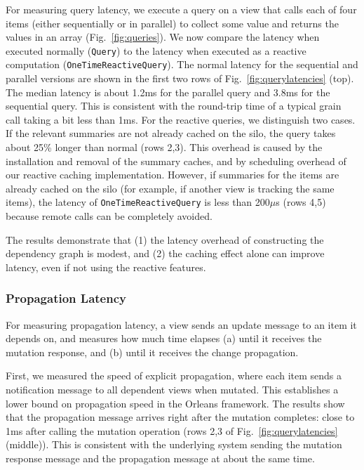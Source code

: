 For measuring query latency, we execute a query on a view that calls each of four items (either sequentially or in parallel) to collect some value and returns the values in an array (Fig.~\ref{fig:queries}). We now compare the latency when executed normally (\lstinline|Query|) to the latency when executed as a reactive computation (\lstinline|OneTimeReactiveQuery|). The normal latency for the sequential and parallel versions are shown in the first two rows of Fig.~\ref{fig:querylatencies} (top). The median latency is about 1.2ms for the parallel query and 3.8ms for the sequential query. This is consistent with the round-trip time of a typical grain call taking a bit less than 1ms. For the reactive queries, we distinguish two cases. If  the relevant summaries are not already cached on the silo, the query takes about 25\% longer than normal (rows 2,3). This overhead is caused by the installation and removal of the summary caches, and by scheduling overhead of our reactive caching implementation. However, if summaries for the items are already cached on the silo (for example, if another view is tracking the same items), the latency of \lstinline|OneTimeReactiveQuery| is less than 200$\mu$s (rows 4,5) because remote calls can be completely avoided. 

The results demonstrate that (1) the latency overhead of constructing the dependency graph is modest, and (2)  the caching effect alone can improve latency, even if not using the reactive features.

\subsubsection{Propagation Latency}

For measuring propagation latency, a view sends an update message to an item it depends on, and measures how much time elapses (a) until it receives the mutation response, and (b) until it receives the change propagation. 

First, we measured the speed of explicit propagation, where each item sends a notification message to all dependent views when mutated. This establishes a lower bound on propagation speed in the Orleans framework. The results show that the propagation message arrives right after the mutation completes: close to 1ms after calling the mutation operation (rows 2,3 of Fig.~\ref{fig:querylatencies} (middle)). This is consistent with the underlying system sending the mutation response message and the propagation message at about the same time. 

